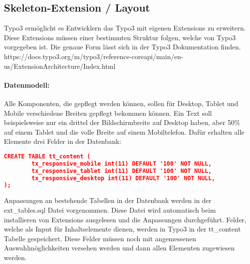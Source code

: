 \subsection{Skeleton-Extension / Layout}
\label{sec:Skeleton-Extension / Layout}
Typo3 ermöglicht es Entwicklern das Typo3 mit eigenen Extensions zu erweitern. Diese Extensions müssen einer bestimmten Struktur folgen, welche von Typo3 vorgegeben ist. Die genaue Form lässt sich in der Typo3 Dokumentation finden. \newline https://docs.typo3.org/m/typo3/reference-coreapi/main/en-us/ExtensionArchitecture/Index.html
\paragraph{Datenmodell:}

Alle Komponenten, die gepflegt werden können, sollen für Desktop, Tablet und Mobile verschiedene Breiten gepflegt bekommen können. Ein Text soll beispielsweise nur ein drittel der Bildschirmbreite auf Desktop haben, aber 50\% auf einem Tablet und die volle Breite auf einem Mobiltelefon. Dafür erhalten alle Elemente drei Felder in der Datenbank:
\begin{lstlisting}[language=json,firstnumber=1]
CREATE TABLE tt_content (
        tx_responsive_mobile int(11) DEFAULT '100' NOT NULL,
        tx_responsive_tablet int(11) DEFAULT '100' NOT NULL,
        tx_responsive_desktop int(11) DEFAULT '100' NOT NULL,
);
\end{lstlisting}
Anpassungen an bestehende Tabellen in der Datenbank werden in der ext\_tables.sql Datei vorgenommen. Diese Datei wird automatisch beim installieren von Extensions ausgelesen und die Anpassungen durchgeführt. Felder, welche als Input für Inhaltselemente dienen, werden in Typo3 in der tt\_content Tabelle gespeichert. Diese Felder müssen noch mit angemessenen Auswahlmöglichkeiten versehen werden und dann allen Elementen zugewiesen werden.
